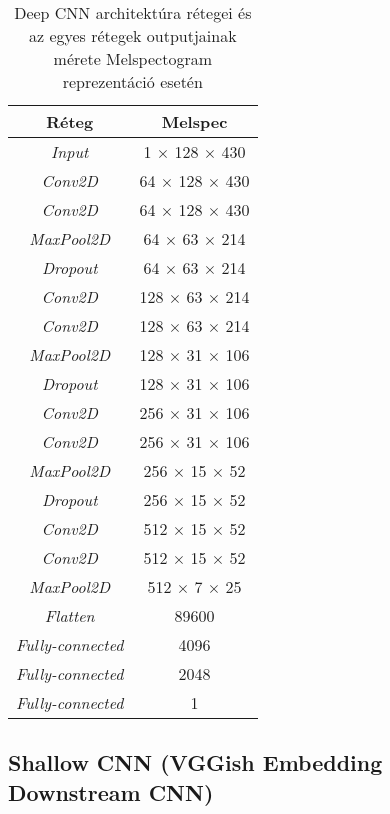 \begin{table}[H]
	\centering
	\begin{tabular}{ | c | c |}
		\hline
		\textbf{Réteg} & \textbf{Melspec}  \\
		\hline \hline
		\emph{Input} & 1 $\times$ 128 $\times$ 430 \\
		\hline
		\emph{Conv2D} & 64 $\times$ 128 $\times$ 430 \\
		\hline
		\emph{Conv2D} & 64 $\times$ 128 $\times$ 430 \\
		\hline
		\emph{MaxPool2D} & 64 $\times$ 63 $\times$ 214 \\
		\hline
		\emph{Dropout} & 64 $\times$ 63 $\times$ 214 \\
		\hline 
		\emph{Conv2D} & 128 $\times$ 63 $\times$ 214 \\
		\hline
		\emph{Conv2D} & 128 $\times$ 63 $\times$ 214 \\
		\hline
		\emph{MaxPool2D} & 128 $\times$ 31 $\times$ 106 \\
		\hline
		\emph{Dropout} & 128 $\times$ 31 $\times$ 106 \\
		\hline 
		\emph{Conv2D} & 256 $\times$ 31 $\times$ 106 \\
		\hline
		\emph{Conv2D} & 256 $\times$ 31 $\times$ 106 \\
		\hline
		\emph{MaxPool2D} & 256 $\times$ 15 $\times$ 52 \\
		\hline
		\emph{Dropout} & 256 $\times$ 15 $\times$ 52 \\
		\hline 
		\emph{Conv2D} & 512 $\times$ 15 $\times$ 52 \\
		\hline
		\emph{Conv2D} & 512 $\times$ 15 $\times$ 52 \\
		\hline
		\emph{MaxPool2D} & 512 $\times$ 7 $\times$ 25 \\
		\hline
		\emph{Flatten} & 89600 \\
		\hline
		\emph{Fully-connected} & 4096 \\
		\hline
		\emph{Fully-connected} & 2048 \\
		\hline
		\emph{Fully-connected} & 1 \\
		\hline
	\end{tabular}
	\caption{Deep CNN architektúra rétegei és az egyes rétegek outputjainak mérete Melspectogram reprezentáció esetén}
	\label{tab:dcnn}
\end{table}

\subsection{Shallow CNN (VGGish Embedding Downstream CNN)}

